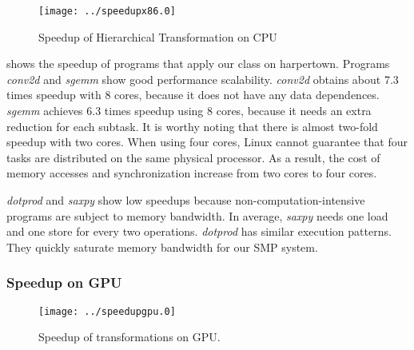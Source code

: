 \begin{figure}
  \texttt{[image: ../speedupx86.0]}
  \caption{Speedup of Hierarchical Transformation on CPU}
  \label{fig:spdx86}
\end{figure}

 shows the speedup of programs that apply our
 class on harpertown. 
Programs \textit{conv2d} and \textit{sgemm} show good performance scalability.
\textit{conv2d} obtains about 7.3 times speedup with 8 cores, because it does not
have any data dependences.
\textit{sgemm} achieves 6.3 times speedup using 8 cores, because it
needs an extra reduction for each subtask.  It is
worthy noting that there is almost two-fold speedup with two cores. 
When using four cores, Linux cannot guarantee that four tasks are distributed
on the same physical processor. As a result, the cost of memory accesses and synchronization
increase from two cores to four cores.


\textit{dotprod} and \textit{saxpy} show low speedups because non-computation-intensive
programs are subject to memory bandwidth.  In average, \textit{saxpy} needs one load and one 
store for every two operations. \textit{dotprod} has similar execution patterns.
They quickly saturate memory bandwidth for our SMP system. 


\subsubsection{Speedup on GPU}\label{exp:2}

\begin{figure}
\texttt{[image: ../speedupgpu.0]}
\caption{Speedup of transformations on GPU.}
\label{fig:spdgpu}
\end{figure}

